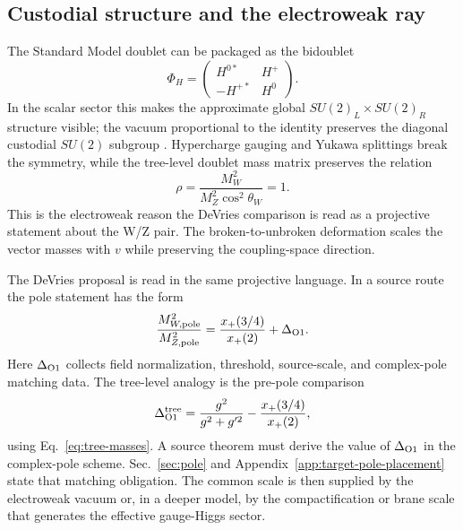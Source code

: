 \subsection{Custodial structure and the electroweak ray}

The Standard Model doublet can be packaged as the bidoublet
\begin{equation}
  \Phi_H=\begin{pmatrix}
  H^{0*} & H^+\\
  -H^{+*} & H^0
  \end{pmatrix}.
  \label{eq:higgs-bidoublet}
\end{equation}
In the scalar sector this makes the approximate global \(SU(2)_L\times SU(2)_R\) structure visible; the vacuum proportional to the identity preserves the diagonal custodial \(SU(2)\) subgroup \cite{Logan2022}.  Hypercharge gauging and Yukawa splittings break the symmetry, while the tree-level doublet mass matrix preserves the relation
\begin{equation}
  \rho=\frac{M_W^2}{M_Z^2\cos^2\theta_W}=1.
  \label{eq:rho-tree}
\end{equation}
This is the electroweak reason the DeVries comparison is read as a projective statement about the W/Z pair.  The broken-to-unbroken deformation scales the vector masses with \(v\) while preserving the coupling-space direction.

The DeVries proposal is read in the same projective language.  In a source
route the pole statement has the form
\begin{equation}
  \frac{M_{W,\rm pole}^2}{M_{Z,\rm pole}^2}
  =
  \frac{x_+(3/4)}{x_+(2)}
  +\Delta_{\rm O1}.
  \label{eq:projective-identification}
\end{equation}
Here \(\Delta_{\rm O1}\) collects field normalization, threshold, source-scale,
and complex-pole matching data.  The tree-level analogy is the pre-pole
comparison
\begin{equation}
  \Delta_{\rm O1}^{\rm tree}
  =
  \frac{g^2}{g^2+g'^2}
  -
  \frac{x_+(3/4)}{x_+(2)} ,
  \label{eq:delta-o1-tree}
\end{equation}
using Eq.~\eqref{eq:tree-masses}.  A source theorem must derive the value of
\(\Delta_{\rm O1}\) in the complex-pole scheme.  Sec.~\ref{sec:pole} and
Appendix~\ref{app:target-pole-placement} state that matching obligation.
The common scale is then supplied by the electroweak vacuum or, in a deeper
model, by the compactification or brane scale that generates the effective
gauge-Higgs sector.

